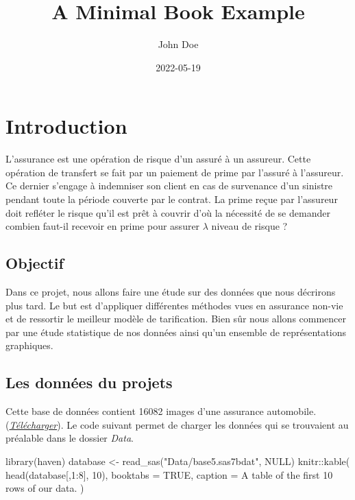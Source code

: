 \documentclass[
]{book}
\title{A Minimal Book Example}
\author{John Doe}
\date{2022-05-19}
\newenvironment{Shaded}{\begin{snugshade}}{\end{snugshade}}
\newcommand{\AttributeTok}[1]{\textcolor[rgb]{0.77,0.63,0.00}{#1}}
\newcommand{\ConstantTok}[1]{\textcolor[rgb]{0.00,0.00,0.00}{#1}}
\newcommand{\DecValTok}[1]{\textcolor[rgb]{0.00,0.00,0.81}{#1}}
\newcommand{\FunctionTok}[1]{\textcolor[rgb]{0.00,0.00,0.00}{#1}}
\newcommand{\NormalTok}[1]{#1}
\newcommand{\OtherTok}[1]{\textcolor[rgb]{0.56,0.35,0.01}{#1}}
\newcommand{\SpecialCharTok}[1]{\textcolor[rgb]{0.00,0.00,0.00}{#1}}
\newcommand{\StringTok}[1]{\textcolor[rgb]{0.31,0.60,0.02}{#1}}
\theoremstyle{definition}
\theoremstyle{definition}
\theoremstyle{definition}
\theoremstyle{definition}
\theoremstyle{remark}
\begin{document}
\maketitle

{
\setcounter{tocdepth}{1}
\tableofcontents
}
\hypertarget{introduction}{%
\chapter*{Introduction}\label{introduction}}

L'assurance est une opération de risque d'un assuré à un assureur. Cette opération de transfert se fait par un paiement de prime par l'assuré à l'assureur. Ce dernier s'engage à indemniser son client en cas de survenance d'un sinistre pendant toute la période couverte par le contrat.
La prime reçue par l'assureur doit refléter le risque qu'il est prêt à couvrir d'où la nécessité de se demander combien faut-il recevoir en prime pour assurer \(\lambda\) niveau de risque ?

\hypertarget{objectif}{%
\section{Objectif}\label{objectif}}

Dans ce projet, nous allons faire une étude sur des données que nous décrirons plus tard. Le but est d'appliquer différentes méthodes vues en assurance non-vie et de ressortir le meilleur modèle de tarification. Bien sûr nous allons commencer par une étude statistique de nos données ainsi qu'un ensemble de représentations graphiques.

\hypertarget{les-donnuxe9es-du-projets}{%
\section{Les données du projets}\label{les-donnuxe9es-du-projets}}

Cette base de données contient 16082 images d'une assurance automobile. (\href{https://github.com/AODiakite/Tarification/blob/master/data/base5.sas7bdat}{\emph{Télécharger}}).
Le code suivant permet de charger les données qui se trouvaient au préalable dans le dossier \emph{Data}.

\begin{Shaded}
\begin{Highlighting}[]
\FunctionTok{library}\NormalTok{(haven)}
\NormalTok{database }\OtherTok{\textless{}{-}} \FunctionTok{read\_sas}\NormalTok{(}\StringTok{"Data/base5.sas7bdat"}\NormalTok{, }
    \ConstantTok{NULL}\NormalTok{)}
\NormalTok{knitr}\SpecialCharTok{::}\FunctionTok{kable}\NormalTok{(}
  \FunctionTok{head}\NormalTok{(database[,}\DecValTok{1}\SpecialCharTok{:}\DecValTok{8}\NormalTok{], }\DecValTok{10}\NormalTok{), }\AttributeTok{booktabs =} \ConstantTok{TRUE}\NormalTok{,}
  \AttributeTok{caption =} \StringTok{\textquotesingle{}A table of the first 10 rows of our data.\textquotesingle{}}
\NormalTok{)}
\end{Highlighting}
\end{Shaded}
\end{document}
